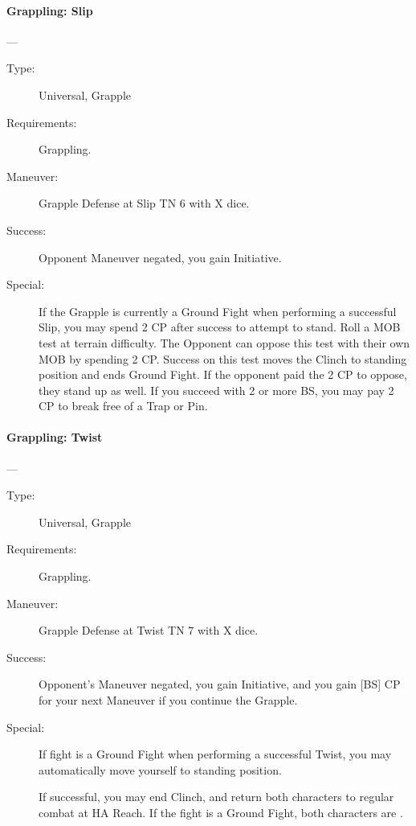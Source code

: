 \paragraph{Grappling: Slip \large} \label{man:grappling-slip}
---\quad {\large [X]}
\vspace{-10pt} \begin{description}
\item [Type:] Universal, Grapple
\item [Requirements:] Grappling.
\item [Maneuver:] Grapple Defense at Slip TN 6 with X dice.
\item [Success:] Opponent Maneuver negated, you gain Initiative.
\item [Special:] If the Grapple is currently a Ground Fight when performing a
  successful Slip, you may spend 2 CP after success to attempt to stand. Roll a
  MOB test at terrain difficulty. The Opponent can oppose this test with their
  own MOB by spending 2 CP. Success on this test moves the Clinch to standing
  position and ends Ground Fight. If the opponent paid the 2 CP to oppose, they
  stand up as well. If you succeed with 2 or more BS, you may pay 2 CP to break
  free of a Trap or Pin.  
\end{description}

\paragraph{Grappling: Twist \large} \label{man:grappling-twist}
---\quad {\large [X]}
\vspace{-10pt} \begin{description}
\item [Type:] Universal, Grapple
\item [Requirements:] Grappling.
\item [Maneuver:] Grapple Defense at Twist TN 7 with X dice.
\item [Success:] Opponent's Maneuver negated, you gain Initiative, and you gain
  [BS] CP for your next Maneuver if you continue the Grapple. 
\item [Special:] If fight is a Ground Fight when performing a successful Twist,
  you may automatically move yourself to standing position. 

If successful, you may end Clinch, and return both characters to regular combat
at HA Reach. If the fight is a Ground Fight, both characters are . 
\end{description}

